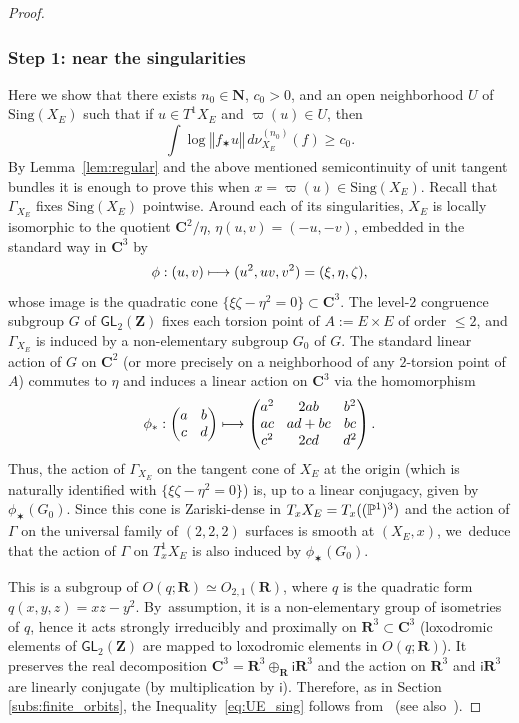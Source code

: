 \documentclass[11pt]{article}
\newcommand\mto{\mathchoice{\longmapsto}{\mapsto}{\mapsto}{\mapsto}}
\newcommand{\norm}[1]{{\left\Vert#1\right\Vert}}
\def\C{\mathbf{C}}
\def\R{\mathbf{R}}
\def\Z{\mathbf{Z}}
\def\N{\mathbf{N}}
\newcommand{\Sing}{{\mathrm{Sing}}}
\newcommand\ii{{\mathsf{i}}}
\newcommand\GL{{\mathsf{GL}}}
\theoremstyle{plain}
\theoremstyle{definition}
\numberwithin{equation}{section}
\begin{document}
\begin{proof}
\subsubsection*{Step 1: near the singularities}
Here we show that there exists $n_0\in \N$, $c_0>0$,
and an open neighborhood $U$ of $\Sing (X_E)$ such that if $u\in T^1X_E$ and
$\varpi(u)\in U$, then
\begin{equation}\label{eq:UE_sing}
\int \log\norm{f_\varstar u}\, d\nu_{X_E}^{(n_0)}(f) \geq c_0.
\end{equation}
By Lemma~\ref{lem:regular} and the above mentioned semicontinuity of unit tangent
bundles it is enough to prove this when
$x=\varpi(u)\in \Sing(X_E)$.
Recall that $\Gamma_{X_E}$ fixes $\Sing(X_E)$ pointwise. Around each of its singularities, $X_E$ is locally isomorphic to the quotient
$\C^2/\eta$, $\eta(u,v)=(-u,-v)$, embedded in the standard way in $\C^3$ by
\begin{equation*}
\phi: (u,v)\mto (u^2, uv, v^2) = (\xi,\eta,\zeta),
\end{equation*}
whose image is the quadratic cone $\{\xi\zeta-\eta^2 = 0\}\subset \C^3$. The level-$2$ congruence
subgroup $G$ of $\GL_2(\Z)$
fixes each torsion point of $A:=E\times E$ of order $\leq 2$, and $\Gamma_{X_E}$ is induced by
a non-elementary subgroup $G_0$ of $G$.
The standard linear action of $G$ on $\C^2$ (or more precisely on a neighborhood of any $2$-torsion point of $A$) commutes to $\eta$ and induces a linear action on $\C^3$ via the homomorphism
\begin{equation*}\arraycolsep4.5pt
\phi_\varstar: \begin{pmatrix} a&b\\ c&d\end{pmatrix} \longmapsto
\begin{pmatrix} a^2 & 2ab &b ^2 \\ ac & ad+bc & bc \\ c^2 & 2cd & d^2\end{pmatrix}.
\end{equation*}
Thus, the action of $\Gamma_{X_E}$ on the tangent cone
of $X_E$ at the origin (which is naturally identified with $\{\xi\zeta-\eta^2 = 0\}$)
is, up to a linear conjugacy, given by $\phi_\varstar(G_0)$. Since this cone is Zariski-dense in
$T_xX_E = T_x((\P^1)^3)$ and the action of $\Gamma$ on the universal family of $(2,2,2)$ surfaces is smooth at $(X_E, x)$, we~deduce that the action of $\Gamma$ on $T^1_xX_E$ is also induced
by $\phi_\varstar(G_0)$.

This is a subgroup
of $O(q;\R)\simeq O_{2,1}(\R)$, where $q$ is the quadratic form $q(x,y,z) = xz-y^2$. By~assumption, it is a non-elementary group of isometries of $q$, hence it acts strongly irreducibly and proximally on $\R^3\subset \C^3$ (loxodromic elements of $\GL_2(\Z)$ are mapped to loxodromic elements in $O(q;\R)$). It preserves the real decomposition $ \C^3=\R^3\oplus_\R \ii \R^3$ and the action on $\R^3$ and $\ii \R^3$ are linearly conjugate (by multiplication by $\ii$). Therefore, as in Section \ref{subs:finite_orbits}, the Inequality~\eqref{eq:UE_sing} follows from~\cite{furstenberg-kifer} (see also~\cite[Chap.\,III, Cor.\,3.4(iii)]{bougerol-lacroix}).


\end{proof}
\end{document}
